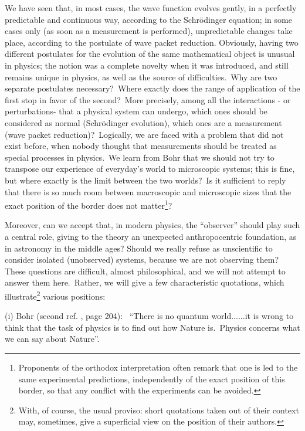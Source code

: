 \documentclass[12pt,onecolumn]{article}%
\begin{document}
We have seen that, in most cases, the wave function evolves gently, in a
perfectly predictable and continuous way, according to the Schr\"{o}dinger
equation; in some cases only (as soon as a measurement is performed),
unpredictable changes take place, according to the postulate of wave packet
reduction. Obviously, having two different postulates for the evolution of the
same mathematical object is unusual in physics; the notion was a complete
novelty when it was introduced, and still remains unique in physics, as well
as the source of difficulties.\ Why are two separate postulates
necessary?\ Where exactly does the range of application of the first stop in
favor of the second?\ More precisely, among all the interactions - or
perturbations- that a physical system can undergo, which ones should be
considered as normal (Schr\"{o}dinger evolution), which ones are a measurement
(wave packet reduction)?\ Logically, we are faced with a problem that did not
exist before, when nobody thought that measurements should be treated as
special processes in physics.\ We learn from Bohr that we should not try to
transpose our experience of everyday's world to microscopic systems; this is
fine, but where exactly is the limit between the two worlds?\ Is it sufficient
to reply that there is so much room between macroscopic and microscopic sizes
that the exact position of the border does not matter\footnote{Proponents of
the orthodox interpretation often remark that one is led to the same
experimental predictions, independently of the exact position of this border,
so that any conflict with the experiments can be avoided.}?

Moreover, can we accept that, in modern physics, the ``observer'' should play
such a central role, giving to the theory an unexpected anthropocentric
foundation, as in astronomy in the middle ages? Should we really refuse as
unscientific to consider isolated (unobserved) systems, because we are not
observing them? These questions are difficult, almost philosophical, and we
will not attempt to answer them here.\ Rather, we will give a few
characteristic quotations, which illustrate\footnote{With, of course, the
usual proviso: short quotations taken out of their context may, sometimes,
give a superficial view on the position of their authors.} various positions:

(i) Bohr (second ref. \cite{Jammer}, page 204): \ ``There is no quantum
world......it is wrong to think that the task of physics is to find out how
Nature is.\ Physics concerns what we can say about Nature''.
\end{document}
